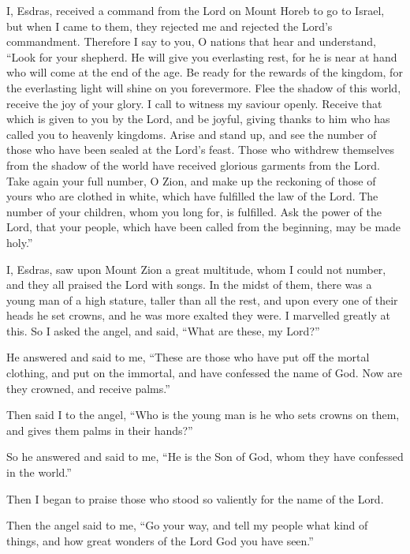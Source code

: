  I, Esdras, received a command from the Lord on Mount Horeb
to go to Israel, but when I came to them, they rejected me and rejected
the Lord's commandment.  Therefore I say to you, O nations
that hear and understand, ``Look for your shepherd. He will give you
everlasting rest, for he is near at hand who will come at the end of the
age.  Be ready for the rewards of the kingdom, for the
everlasting light will shine on you forevermore.  Flee the
shadow of this world, receive the joy of your glory. I call to witness
my saviour openly.  Receive that which is given to you by
the Lord, and be joyful, giving thanks to him who has called you to
heavenly kingdoms.  Arise and stand up, and see the number
of those who have been sealed at the Lord's feast.  Those
who withdrew themselves from the shadow of the world have received
glorious garments from the Lord.  Take again your full
number, O Zion, and make up the reckoning of those of yours who are
clothed in white, which have fulfilled the law of the Lord.
 The number of your children, whom you long for, is
fulfilled. Ask the power of the Lord, that your people, which have been
called from the beginning, may be made holy.''

 I, Esdras, saw upon Mount Zion a great multitude, whom I
could not number, and they all praised the Lord with songs.
 In the midst of them, there was a young man of a high
stature, taller than all the rest, and upon every one of their heads he
set crowns, and he was more exalted they were. I marvelled greatly at
this.  So I asked the angel, and said, ``What are these, my
Lord?''

 He answered and said to me, ``These are those who have put
off the mortal clothing, and put on the immortal, and have confessed the
name of God. Now are they crowned, and receive palms.''

 Then said I to the angel, ``Who is the young man is he who
sets crowns on them, and gives them palms in their hands?''

 So he answered and said to me, ``He is the Son of God,
whom they have confessed in the world.''

Then I began to praise those who stood so valiently for the name of the
Lord.

 Then the angel said to me, ``Go your way, and tell my
people what kind of things, and how great wonders of the Lord God you
have seen.''

